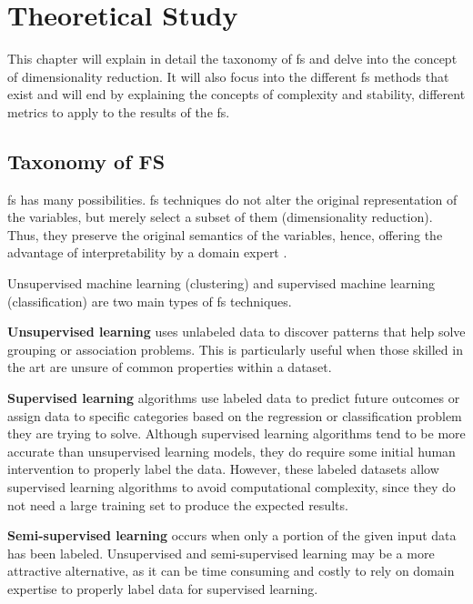 \chapter{Theoretical Study}
\label{cha:theoretical-study}

This chapter will explain in detail the taxonomy of \acrlong{fs} and delve into the concept of dimensionality reduction. It will also focus into the different \acrshort{fs} methods that exist and will end by explaining the concepts of complexity and stability, different metrics to apply to the results of the \acrshort{fs}.

\section{Taxonomy of FS}
\label{sec:taxonomy-fs}

\acrlong{fs} has many possibilities. \acrshort{fs} techniques do not alter the original representation of the variables, but merely select a subset of them (dimensionality reduction). Thus, they preserve the original semantics of the variables, hence, offering the advantage of interpretability by a domain expert \cite{Saeys2007}.

Unsupervised machine learning (clustering) and supervised machine learning (classification) are two main types of \acrshort{fs} techniques.

\textbf{Unsupervised learning} \cite{unsupervised-learning} uses unlabeled data to discover patterns that help solve grouping or association problems. This is particularly useful when those skilled in the art are unsure of common properties within a dataset.

\textbf{Supervised learning} \cite{supervised-learning} algorithms use labeled data to predict future outcomes or assign data to specific categories based on the regression or classification problem they are trying to solve. Although supervised learning algorithms tend to be more accurate than unsupervised learning models, they do require some initial human intervention to properly label the data. However, these labeled datasets allow supervised learning algorithms to avoid computational complexity, since they do not need a large training set to produce the expected results.

\textbf{Semi-supervised learning} occurs when only a portion of the given input data has been labeled. Unsupervised and semi-supervised learning may be a more attractive alternative, as it can be time consuming and costly to rely on domain expertise to properly label data for supervised learning.

